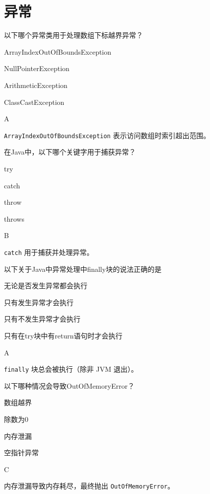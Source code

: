 \section{异常}

\begin{question}
	以下哪个异常类用于处理数组下标越界异常？
	\begin{options}
		\item ArrayIndexOutOfBoundsException
		\item NullPointerException
		\item ArithmeticException
		\item ClassCastException
	\end{options}
	\begin{answer}
		A
	\end{answer}
	\begin{explanation}
		\texttt{ArrayIndexOutOfBoundsException} 表示访问数组时索引超出范围。
	\end{explanation}
\end{question}

\begin{question}
	在Java中，以下哪个关键字用于捕获异常？
	\begin{options}
		\item try
		\item catch
		\item throw
		\item throws
	\end{options}
	\begin{answer}
		B
	\end{answer}
	\begin{explanation}
		\texttt{catch} 用于捕获并处理异常。
	\end{explanation}
\end{question}

\begin{question}
	以下关于Java中异常处理中finally块的说法正确的是
	\begin{options}
		\item 无论是否发生异常都会执行
		\item 只有发生异常才会执行
		\item 只有不发生异常才会执行
		\item 只有在try块中有return语句时才会执行
	\end{options}
	\begin{answer}
		A
	\end{answer}
	\begin{explanation}
		\texttt{finally} 块总会被执行（除非 JVM 退出）。
	\end{explanation}
\end{question}

\begin{question}
	以下哪种情况会导致OutOfMemoryError？
	\begin{options}
		\item 数组越界
		\item 除数为0
		\item 内存泄漏
		\item 空指针异常
	\end{options}
	\begin{answer}
		C
	\end{answer}
	\begin{explanation}
		内存泄漏导致内存耗尽，最终抛出 \texttt{OutOfMemoryError}。
	\end{explanation}
\end{question}
